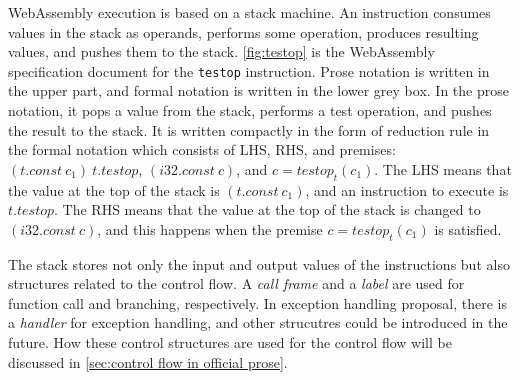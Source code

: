 WebAssembly execution is based on a stack machine.
An instruction consumes values in the stack as operands, performs some
operation, produces resulting values, and pushes them to the stack.
\cref{fig:testop} is the WebAssembly specification document for the
\texttt{testop} instruction.
Prose notation is written in the upper part, and formal notation is written in
the lower grey box.
In the prose notation, it pops a value from the stack, performs a test
operation, and pushes the result to the stack.
It is written compactly in the form of reduction rule in the formal notation
which consists of LHS, RHS, and premises: $(t.const ~ c_1) ~ t.testop$,
$(i32.const ~ c)$, and $c = testop_t(c_1)$.
The LHS means that the value at the top of the stack is $(t.const ~ c_1)$,
and an instruction to execute is $t.testop$.
The RHS means that the value at the top of the stack is changed to $(i32.const
~ c)$, and this happens when the premise $c = testop_t(c_1)$ is satisfied.


The stack stores not only the input and output values of the instructions but also
structures related to the control flow.
A \textit{call frame} and a \textit{label} are used for function call and
branching, respectively.
In exception handling proposal, there is a \textit{handler} for exception
handling, and other strucutres could be introduced in the future.
How these control structures are used for the control flow will be discussed in
\cref{sec:control flow in official prose}.

